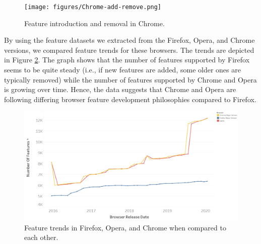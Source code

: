 \begin{figure}[ht]
    \centering
    \texttt{[image: figures/Chrome-add-remove.png]}
    \caption{Feature introduction and removal in Chrome.}
    \label{fig:chaddremove}
\end{figure}

By using the feature datasets we extracted from the Firefox, Opera, and Chrome
versions, we compared feature trends for these browsers. The trends are
depicted in Figure \ref{fig:featuretrends}. The graph shows that the
  number of features supported by Firefox seems to be quite steady
  (i.e., if new features are added, some older ones are typically
  removed) while the number of features supported by Chrome and Opera is growing
  over time. Hence, the data suggests that Chrome and Opera are
  following differing browser feature development philosophies compared to Firefox.

\begin{figure}[ht]
    \centering
    \includegraphics[width=\columnwidth]{figures/Feature-Trends.PNG}
    \caption{Feature trends in Firefox, Opera, and Chrome when compared to
      each other.}
    \label{fig:featuretrends}
\end{figure}

